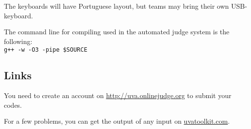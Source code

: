 \documentclass[12pt]{article}
\begin{document}
The keyboards will have Portuguese layout, but teams may bring their own USB-keyboard.

The command line for compiling used in the automated judge system is the following:\\
\texttt{g++ -w -O3 -pipe \$SOURCE}

\subsection*{Links}

You need to create an account on \url{http://uva.onlinejudge.org} to submit your codes. 

For a few problems, you can get the output of any input on \url{uvatoolkit.com}.








\end{document}
